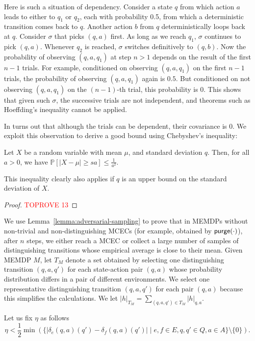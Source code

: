 \documentclass[a4paper,USenglish,cleveref, autoref, thm-restate]{lipics-v2021}
\def\abs#1{\ensuremath{\lvert #1 \rvert}}
\newcommand*{\pr}{\mathbb{P}}
\def\Act{A}
\newcommand\purge[1]{\textrm{\sf purge}(#1)}
\begin{document}
Here is such a situation of dependency. 
Consider a state $q$ from which action $a$ leads to either to $q_1$ or $q_2$, each with probability 0.5, from which a deterministic transition comes back to $q$.
Another action $b$ from $q$ deterministically loops back at $q$.
Consider $\sigma$ that picks $(q,a)$ first. As long as we reach $q_1$, $\sigma$ continues to pick $(q,a)$. Whenever $q_2$ is reached, $\sigma$ switches definitively to $(q,b)$.
Now the probability of observing $(q,a,q_1)$ at step $n>1$ depends on the result of the first $n-1$ trials. 
For example, conditioned on 
observing $(q,a,q_1)$ on the first $n-1$ trials, the probability of observing $(q,a,q_1)$ again is $0.5$.
But conditioned on not observing $(q,a,q_1)$ on the $(n-1)$-th trial, this probability is $0$. This shows that given such $\sigma$, the successive trials are not independent,
and theorems such as Hoeffding's inequality cannot be applied.


In turns out that although the trials can be dependent, their covariance is 0. We exploit this observation to derive a good bound using
Chebyshev's inequality:
\begin{theorem}
  \label{thm:chebyshev}
  Let $X$ be a random variable with mean $\mu$, and standard deviation $q$. Then, for all $a>0$, we have
  \(
    \pr[ \abs{X-\mu} \geq s a ] \leq \frac{1}{a^2}.
  \)
\end{theorem}
This inequality clearly also applies if $q$ is an upper bound on the standard deviation of $X$.

\begin{proof}\textcolor{red}{TOPROVE 13}\end{proof}


We use Lemma~\ref{lemma:adversarial-sampling} to prove that in MEMDPs without non-trivial and non-distinguishing MCECs (for example, obtained by $\purge{\cdot}$),
after $n$ steps, we either reach a MCEC or collect a large number of samples of distinguishing transitions whose empirical average is close to their mean.
Given MEMDP $M$, let $T_M$ denote a set obtained by selecting one distinguishing transition $(q,a,q')$ for each state-action pair $(q,a)$ whose probability 
distribution differs in a pair of different environments.
We select one representative distinguishing transition $(q,a,q')$ for each pair $(q,a)$ because this simplifies the calculations.
We let $\abs{h}_{T_M} = \sum_{(q,a,q') \in T_M}\abs{h}_{q,a}$.

Let us fix $\eta$ as follows
\[
  \eta<\frac{1}{2}\min\left(\{\abs{\delta_e(q,a)(q') - \delta_{f}(q,a)(q')} \mid e,f \in E, q,q'\in Q, a \in \Act\}\setminus\{0\}\right).
\]
\end{document}
